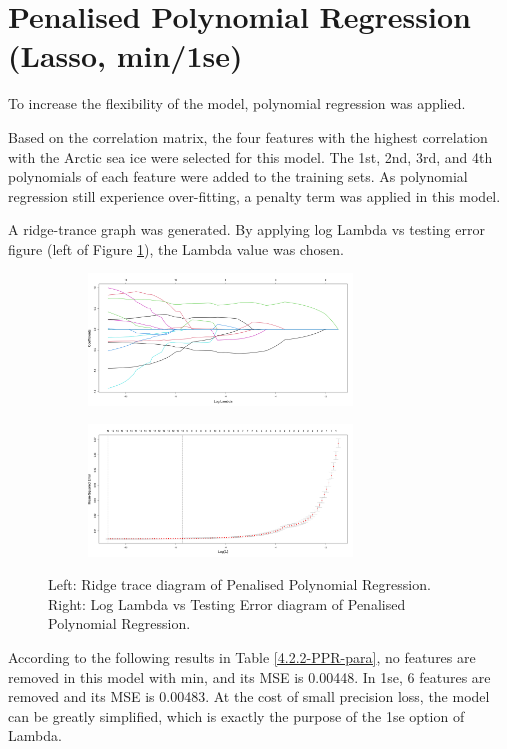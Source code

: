 \section{Penalised Polynomial Regression (Lasso, min/1se)} %

To increase the flexibility of the model, polynomial regression was applied. 

Based on the correlation matrix, the four features with the highest correlation with the Arctic sea ice were selected for this model. The 1st, 2nd, 3rd, and 4th polynomials of each feature were added to the training sets. As polynomial regression still experience over-fitting, a penalty term was applied in this model.

A ridge-trance graph was generated. By applying log Lambda vs testing error figure (left of Figure \ref{4.2.3-NEW-PPR-ridge-trance-Log-Lambda}), the Lambda value was chosen.


\begin{figure}[htbp]
\center
  \begin{subfigure}{7.5cm}
    \centering\includegraphics[width=7cm]{Figure/4.2.3-PPR-ridge-trance.png}
  \end{subfigure}
  \begin{subfigure}{7.5cm}
    \centering\includegraphics[width=7cm]{Figure/4.2.3-PPR-Log-Lambda-vs-Testing-Error.png}
  \end{subfigure}
  \caption{Left: Ridge trace diagram of Penalised Polynomial Regression. Right: Log Lambda vs Testing Error diagram of Penalised Polynomial Regression.}
  \label{4.2.3-NEW-PPR-ridge-trance-Log-Lambda}
\end{figure}

According to the following results in Table \ref{4.2.2-PPR-para}, no features are removed in this model with min, and its MSE is 0.00448. In 1se, 6 features are removed and its MSE is 0.00483. At the cost of small precision loss, the model can be greatly simplified, which is exactly the purpose of the 1se option of Lambda.

